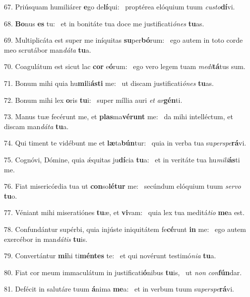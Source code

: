 67. Priúsquam humiliárer \textbf{e}go de\textbf{lí}qui: \ast\  proptérea elóquium tuum \textit{cus}\textit{to}\textbf{dí}vi.\

68. \textbf{Bo}nus \textbf{es} tu: \ast\  et in bonitáte tua doce me justificati\textit{ó}\textit{nes} \textbf{tu}as.\

69. Multiplicáta est super me iníquitas \textbf{su}per\textbf{bó}rum: \ast\  ego autem in toto corde meo scrutábor man\textit{dá}\textit{ta} \textbf{tu}a.\

70. Coagulátum est sicut lac \textbf{cor} e\textbf{ó}rum: \ast\  ego vero legem tuam \textit{me}\textit{di}\textbf{tá}tus sum.\

71. Bonum mihi quia hu\textbf{mi}li\textbf{ás}\textbf{ti} me: \ast\  ut discam justificati\textit{ó}\textit{nes} \textbf{tu}as.\

72. Bonum mihi lex \textbf{o}ris \textbf{tu}i: \ast\  super míllia auri \textit{et} \textit{ar}\textbf{gén}ti.\

73. Manus tuæ fecérunt me, et \textbf{plas}ma\textbf{vé}\textbf{runt} me: \ast\  da mihi intelléctum, et discam man\textit{dá}\textit{ta} \textbf{tu}a.\

74. Qui timent te vidébunt me et \textbf{læ}ta\textbf{bún}tur: \ast\  quia in verba tua su\textit{per}\textit{spe}\textbf{rá}vi.\

75. Cognóvi, Dómine, quia ǽquitas ju\textbf{dí}cia \textbf{tu}a: \ast\  et in veritáte tua hu\textit{mi}\textit{li}\textbf{ás}ti me.\

76. Fiat misericórdia tua ut \textbf{con}so\textbf{lé}\textbf{tur} me: \ast\  secúndum elóquium tuum \textit{ser}\textit{vo} \textbf{tu}o.\

77. Véniant mihi miseratiónes \textbf{tu}æ, et \textbf{vi}vam: \ast\  quia lex tua meditá\textit{ti}\textit{o} \textbf{me}a est.\

78. Confundántur supérbi, quia injúste iniquitátem fe\textbf{cé}runt \textbf{in} me: \ast\  ego autem exercébor in man\textit{dá}\textit{tis} \textbf{tu}is.\

79. Convertántur \textbf{mi}hi ti\textbf{mén}\textbf{tes} te: \ast\  et qui novérunt testimó\textit{ni}\textit{a} \textbf{tu}a.\

80. Fiat cor meum immaculátum in justificati\textbf{ó}nibus \textbf{tu}is, \ast\  ut \textit{non} \textit{con}\textbf{fún}dar.\

81. Defécit in salutáre tuum \textbf{á}nima \textbf{me}a: \ast\  et in verbum tuum su\textit{per}\textit{spe}\textbf{rá}vi.\

